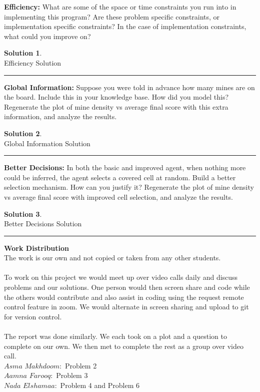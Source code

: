 \documentclass{article}
\theoremstyle{definition}
\def\fline{\rule{0.75\linewidth}{0.5pt}}
\newcommand{\finishline}{\vspace{-15pt}\begin{center}\fline\end{center}}
\newtheorem*{solution*}{Solution}
\newenvironment{solution}{\begin{solution*}}{{\finishline} \end{solution*}}
\begin{document}
\smallskip

\textbf{Efficiency: }
What are some of the space or time constraints you run into in implementing this program? 
Are these problem specific constraints, or implementation specific constraints? 
In the case of implementation constraints, what could you improve on?
\begin{solution} \hfill \\
   Efficiency Solution
\end{solution}

\smallskip

\textbf{Global Information: }
	Suppose you were told in advance how many mines are on the board. Include this in your knowledge base. How did you model this? Regenerate the plot of mine density vs average final score with this extra information, and analyze the results.
\begin{solution} \hfill \\
	Global Information Solution
\end{solution}

\smallskip

\textbf{Better Decisions: }
	In both the basic and improved agent, when nothing more could be inferred, the agent selects a covered cell at random. Build a better selection mechanism. How can you justify it? Regenerate the plot of mine density vs average final score with improved cell selection, and analyze the results.
\begin{solution} \hfill \\
     Better Decisions Solution
\end{solution}

\textbf{Work Distribution}
\\
The work is our own and not copied or taken from any other students. 
\\\\
To work on this project we would meet up over video calls daily and discuss problems and our solutions. One person would then screen share and code while the others would contribute and also assist in coding using the request remote control feature in zoom. We would alternate in screen sharing and upload to git for version control. 
\\\\
The report was done similarly. We each took on a plot and a question to complete on our own. We then met to complete the rest as a group over video call. 
\\
$Asma$ $Makhdoom:$ Problem 2
\\
$Aamna$ $Farooq:$ Problem 3
\\
$Nada$ $Elshamaa:$ Problem 4 and Problem 6
\\
\smallskip
\end{document}
